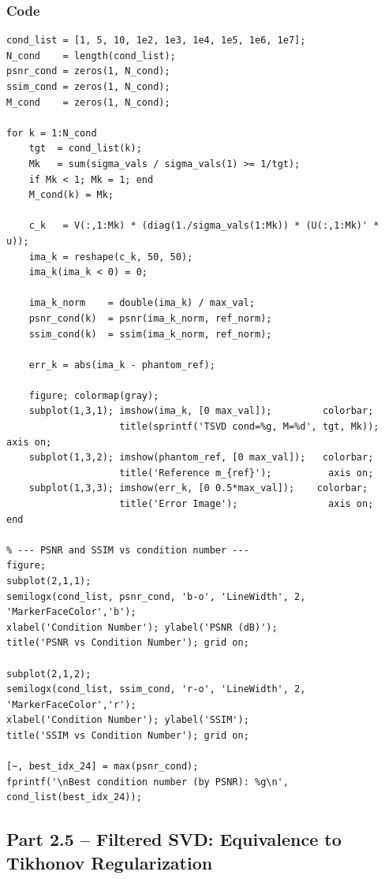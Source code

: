 \documentclass[12pt,a4paper]{article}
\begin{document}
\subsubsection*{Code}
\begin{lstlisting}
cond_list = [1, 5, 10, 1e2, 1e3, 1e4, 1e5, 1e6, 1e7];
N_cond    = length(cond_list);
psnr_cond = zeros(1, N_cond);
ssim_cond = zeros(1, N_cond);
M_cond    = zeros(1, N_cond);

for k = 1:N_cond
    tgt  = cond_list(k);
    Mk   = sum(sigma_vals / sigma_vals(1) >= 1/tgt);
    if Mk < 1; Mk = 1; end
    M_cond(k) = Mk;

    c_k   = V(:,1:Mk) * (diag(1./sigma_vals(1:Mk)) * (U(:,1:Mk)' * u));
    ima_k = reshape(c_k, 50, 50);
    ima_k(ima_k < 0) = 0;

    ima_k_norm    = double(ima_k) / max_val;
    psnr_cond(k)  = psnr(ima_k_norm, ref_norm);
    ssim_cond(k)  = ssim(ima_k_norm, ref_norm);

    err_k = abs(ima_k - phantom_ref);

    figure; colormap(gray);
    subplot(1,3,1); imshow(ima_k, [0 max_val]);         colorbar;
                    title(sprintf('TSVD cond=%g, M=%d', tgt, Mk)); axis on;
    subplot(1,3,2); imshow(phantom_ref, [0 max_val]);   colorbar;
                    title('Reference m_{ref}');          axis on;
    subplot(1,3,3); imshow(err_k, [0 0.5*max_val]);    colorbar;
                    title('Error Image');                axis on;
end

% --- PSNR and SSIM vs condition number ---
figure;
subplot(2,1,1);
semilogx(cond_list, psnr_cond, 'b-o', 'LineWidth', 2, 'MarkerFaceColor','b');
xlabel('Condition Number'); ylabel('PSNR (dB)');
title('PSNR vs Condition Number'); grid on;

subplot(2,1,2);
semilogx(cond_list, ssim_cond, 'r-o', 'LineWidth', 2, 'MarkerFaceColor','r');
xlabel('Condition Number'); ylabel('SSIM');
title('SSIM vs Condition Number'); grid on;

[~, best_idx_24] = max(psnr_cond);
fprintf('\nBest condition number (by PSNR): %g\n', cond_list(best_idx_24));
\end{lstlisting}

\subsection{Part 2.5 -- Filtered SVD: Equivalence to Tikhonov Regularization}
\end{document}
